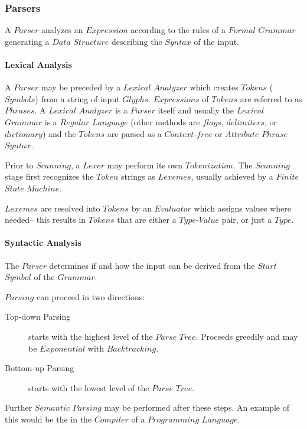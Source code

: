\documentclass{article}
\begin{document}
\subsubsection{Parsers}

A $Parser$ analyzes an $Expression$ according to the rules of a
$Formal$ $Grammar$ generating a $Data$ $Structure$ describing the
$Syntax$ of the input.

\paragraph{Lexical Analysis}
A $Parser$ may be preceded by a $Lexical$ $Analyzer$ which creates
$Tokens$ ($Symbols$) from a string of input $Glyphs$. $Expressions$ of
$Tokens$ are referred to as $Phrases$. A $Lexical$ $Analyzer$ is a
$Parser$ itself and usually the $Lexical$ $Grammar$ is a $Regular$
$Language$ (other methods are $flags$, $delimiters$, or $dictionary$)
and the $Tokens$ are parsed as a $Context$-$free$ or $Attribute$
$Phrase$ $Syntax$.

Prior to $Scanning$, a $Lexer$ may perform its own $Tokenization$.
The $Scanning$ stage first recognizes the $Token$ strings as
$Lexemes$, usually achieved by a $Finite$ $State$ $Machine$.

$Lexemes$ are resolved into $Tokens$ by an $Evaluator$ which assigns
values where needed-- this results in $Tokens$ that are either a
$Type$-$Value$ pair, or just a $Type$.

\paragraph{Syntactic Analysis}

The $Parser$ determines if and how the input can be derived from the
$Start$ $Symbol$ of the $Grammar$.

$Parsing$ can proceed in two directions:

\begin{description}
    \item[Top-down Parsing]
    starts with the highest level of the $Parse$ $Tree$. Proceeds greedily
    and may be $Exponential$ with $Backtracking$.
    \item[Bottom-up Parsing]
    starts with the lowest level of the $Parse$ $Tree$.
\end{description}

Further $Semantic$ $Parsing$ may be performed after these steps. An
example of this would be the in the $Compiler$ of a $Programming$
$Language$.
\end{document}

